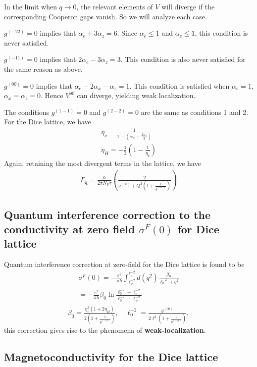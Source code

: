 \documentclass[aps,prb,amsmath,amssymb,footinbib,showpacs,twocolumn]{revtex4-2}
\begin{document}
\begin{widetext}
In the limit when $q\rightarrow 0$, the relevant elements of $V$ will diverge if the corresponding Cooperon gaps vanish. So we will analyze each case. 

$g^{(-22)}=0$ implies that $\alpha_e+3\alpha_z=6$. Since $\alpha_e\leq 1$ and $\alpha_z\leq 1$, this condition is never satisfied. 

$g^{(-11)}=0$ implies that $2\alpha_e-3\alpha_z=3$. This condition is also never satisfied for the same reason as above. 

$g^{(00)}=0$ implies that $\alpha_e-2\alpha_x-\alpha_z = 1$. This condition is satisfied when $\alpha_e=1$, $\alpha_x=\alpha_z=0$. Hence $V^{00}$ can diverge, yielding weak localization. 

The conditions $g^{(1-1)}=0$ and $g^{(2-2)}=0$ are the same as conditions 1 and 2. 
For the Dice lattice, we have 
\begin{align}
    \eta_\nu = \frac{1}{1-\left(\alpha_x+\frac{2\alpha_e}{3}\right)}\nonumber\\
    \eta_H = -\frac{1}{2}\left(1-\frac{1}{\eta_\nu}\right)
\end{align}
Again, retaining the most divergent terms in the lattice, we have 
\begin{align}
    \Gamma_{\mathbf{q}}=\frac{\hbar}{2\pi N_{F}\tau}\left(\frac{2}{g^{(00)}+Q^2\left(1+\frac{1}{g^{(-11)}}\right)}\right)
\end{align}
\subsection{Quantum interference correction to the conductivity
at zero field $\sigma^{F}(0)$ for Dice lattice}
Quantum interference correction at zero-field for the Dice lattice is found to be
\begin{align}
     \sigma^{F}(0)= -\frac{e^{2}}{\pi h}\int_{\ell^{-2}_{\phi}}^{\ell^{-2}_{e}}d(q^{2})\frac{\beta_{0}}{\ell^{-2}_{0}+q^{2}} \\ =
     -\frac{e^{2}}{\pi h}\beta_{0} \ln\frac{\ell^{-2}_{0}+\ell^{-2}_{e}}{\ell^{-2}_{0}+\ell^{-2}_{\phi}}
\end{align}
\begin{align}
  \beta_{0}= \frac{\eta^{2}_{v}(1+2\eta_{H})}{2(1+\frac{1}{g^{(-11)}})}, \quad \ell^{-2}_{0} = \frac{g^{(00)}}{2\ell^{2}(1+\frac{1}{g^{(-11)}})},    
\end{align}
this correction gives rise to the phenomena of \textbf{weak-localization}.
\subsection{Magnetoconductivity for the Dice lattice}


\end{widetext}
\end{document}
